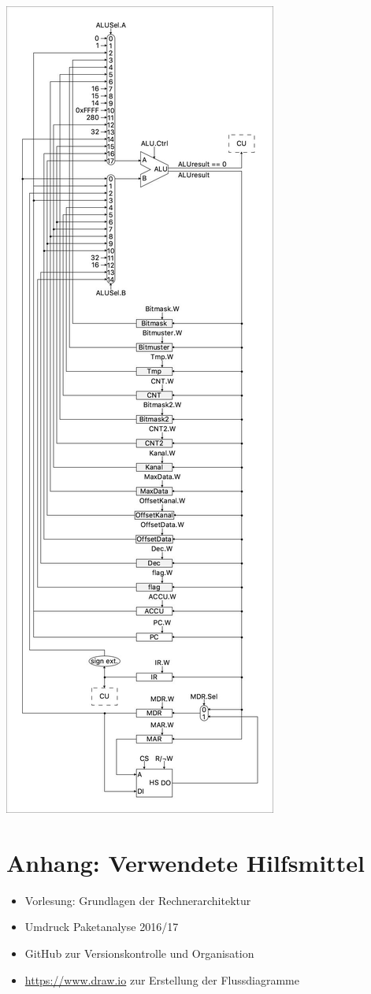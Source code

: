 \documentclass[12pt,titlepage,german,a4]{article}
\begin{document}
	\begin{center}
	\includegraphics[height=19cm\textwidth]{img/maschine.jpg}
	\end{center}
	\newpage

    \section{Anhang: Verwendete Hilfsmittel}
	\begin{itemize}
		\item Vorlesung: Grundlagen der Rechnerarchitektur
		\item Umdruck Paketanalyse 2016/17
		\item GitHub zur Versionskontrolle und Organisation
		\item \url{https://www.draw.io} zur Erstellung der Flussdiagramme
	\end{itemize}
\end{document}
